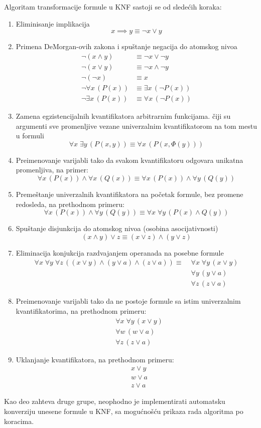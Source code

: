 Algoritam transformacije formule u KNF sastoji se od sledećih koraka:
\begin{enumerate}
\item Eliminisanje implikacija
$$ x \implies y \equiv \neg x \lor y $$
\item Primena DeMorgan-ovih zakona i spuštanje negacija do atomskog nivoa
\begin{align*}
\neg(x \land y) &\equiv \neg x \lor \neg y \\
\neg(x \lor y) &\equiv \neg x \land \neg y \\
\neg (\neg x) &\equiv x \\
\neg \forall x \, (P(x)) &\equiv \exists x \, (\neg P(x)) \\
\neg \exists x \, (P(x)) &\equiv \forall x \, (\neg P(x))
\end{align*}
\item Zamena egzistencijalnih kvantifikatora arbitrarnim funkcijama. čiji su argumenti sve promenljive vezane univerzalnim kvantifikatorom na tom mestu u formuli
$$ \forall x \; \exists y \, (P(x, y)) \equiv \forall x \, (P(x, \Phi(y))) $$
\item Preimenovanje varijabli tako da svakom kvantifikatoru odgovara unikatna promenljiva, na primer:
$$ \forall x \, (P(x)) \land \forall x \, (Q(x)) \equiv
\forall x \, (P(x)) \land \forall y \, (Q(y)) $$
\item Premeštanje univerzalnih kvantifikatora na početak formule, bez promene redosleda, na prethodnom primeru:
$$ \forall x\, (P(x)) \land \forall y \, (Q(y)) \equiv
\forall x \; \forall y \, (P(x) \land Q(y)) $$
\item Spuštanje disjunkcija do atomskog nivoa (osobina asocijativnosti)
$$ (x \land y) \lor z \equiv (x \lor z) \land (y \lor z) $$
\item Eliminacija konjukcija razdvajanjem operanada na posebne formule
\begin{align*}
\forall x \; \forall y \; \forall z \, ((x \lor y) \land (y \lor a) \land (z \lor a)) \equiv \; &\forall x \; \forall y \, (x \lor y) \\
&\forall y \, (y \lor a) \\
&\forall z \, (z \lor a)
\end{align*}
\item Preimenovanje varijabli tako da ne postoje formule sa istim univerzalnim kvantifikatorima, na prethodnom primeru:
\begin{align*}
&\forall x \; \forall y \, (x \lor y) \\
&\forall w \, (w \lor a) \\
&\forall z \, (z \lor a)
\end{align*}
\item Uklanjanje kvantifikatora, na prethodnom primeru:
\begin{align*}
& x \lor y \\
& w \lor a \\
& z \lor a
\end{align*}
\end{enumerate}
Kao deo zahteva druge grupe, neophodno je implementirati automatsku konverziju unesene formule u KNF, sa mogućnošću prikaza rada algoritma po koracima.

